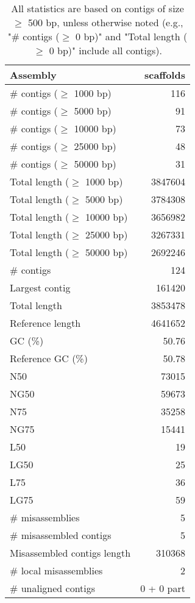 \documentclass[12pt,a4paper]{article}
\begin{document}
\begin{table}[ht]
\begin{center}
\caption{All statistics are based on contigs of size $\geq$ 500 bp, unless otherwise noted (e.g., "\# contigs ($\geq$ 0 bp)" and "Total length ($\geq$ 0 bp)" include all contigs).}
\begin{tabular}{|l*{1}{|r}|}
\hline
Assembly & scaffolds \\ \hline
\# contigs ($\geq$ 1000 bp) & 116 \\ \hline
\# contigs ($\geq$ 5000 bp) & 91 \\ \hline
\# contigs ($\geq$ 10000 bp) & 73 \\ \hline
\# contigs ($\geq$ 25000 bp) & 48 \\ \hline
\# contigs ($\geq$ 50000 bp) & 31 \\ \hline
Total length ($\geq$ 1000 bp) & 3847604 \\ \hline
Total length ($\geq$ 5000 bp) & 3784308 \\ \hline
Total length ($\geq$ 10000 bp) & 3656982 \\ \hline
Total length ($\geq$ 25000 bp) & 3267331 \\ \hline
Total length ($\geq$ 50000 bp) & 2692246 \\ \hline
\# contigs & 124 \\ \hline
Largest contig & 161420 \\ \hline
Total length & 3853478 \\ \hline
Reference length & 4641652 \\ \hline
GC (\%) & 50.76 \\ \hline
Reference GC (\%) & 50.78 \\ \hline
N50 & 73015 \\ \hline
NG50 & 59673 \\ \hline
N75 & 35258 \\ \hline
NG75 & 15441 \\ \hline
L50 & 19 \\ \hline
LG50 & 25 \\ \hline
L75 & 36 \\ \hline
LG75 & 59 \\ \hline
\# misassemblies & 5 \\ \hline
\# misassembled contigs & 5 \\ \hline
Misassembled contigs length & 310368 \\ \hline
\# local misassemblies & 2 \\ \hline
\# unaligned contigs & 0 + 0 part \\ \hline

\end{tabular}
\end{center}
\end{table}
\end{document}

